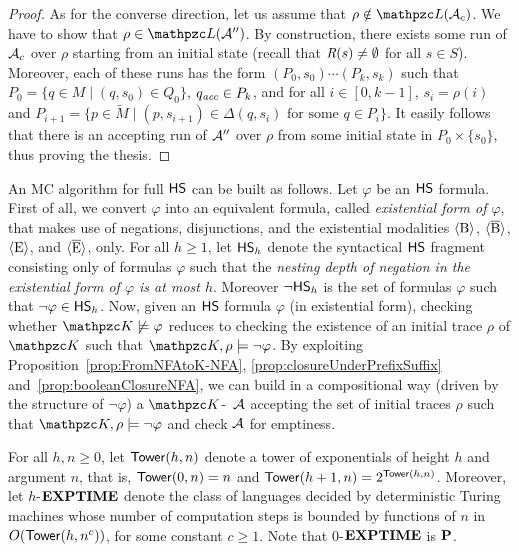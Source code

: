 \begin{proof}
As for the converse direction, let us assume that $\rho \notin \Lang(\Au_c)$.  We have to show that $\rho\in \Lang(\Au'')$.  By construction, there exists some run of
$\mathcal{A}_c$ over $\rho$ starting from an initial state (recall that $\textit{R}(s)\neq \emptyset$  for all $s\in S$). Moreover, each of these runs has the form $(P_0,s_0)\cdots (P_{k},s_k)$
such that  $P_0 = \{q\in M\mid (q,s_0)\in Q_0\}$, $q_{\textit{acc}} \in P_k$, and    for all $i\in [0,k-1]$, $s_i = \rho(i)$
and $P_{i+1} = \{p\in \tilde{M} \mid (p,s_{i+1})\in \Delta(q,s_i) \text{ for some } q\in P_i  \}$. It easily follows that there is an accepting run of
$\mathcal{A}''$ over $\rho$ from some initial state in $P_0\times \{s_0\}$, thus proving the thesis. 
\end{proof}

An MC algorithm for full $\text{\sffamily HS}$ can be built as follows.
%
Let $\varphi$ be an $\text{\sffamily HS}$ formula. First of all, we convert $\varphi$ into an equivalent formula, called \emph{existential form of $\varphi$}, that makes use of negations, disjunctions, and the existential modalities
$\operatorname{\langle B\rangle}$, $\operatorname{\langle \overline{B}\rangle}$, $\operatorname{\langle E\rangle}$, and $\operatorname{\langle \overline{E}\rangle}$, only. %
%
For all $h\geq 1$, let $\text{\sffamily HS}_h$ denote the syntactical $\text{\sffamily HS}$ fragment consisting only of formulas $\varphi$ such that the \emph{nesting depth of negation in the existential form
of $\varphi$ is at most $h$}. Moreover $\neg\text{\sffamily HS}_h$ is the set of formulas $\varphi$ such that $\neg\varphi\in \text{\sffamily HS}_h$.
%
  Now, given an $\text{\sffamily HS}$ formula $\varphi$ (in existential form), checking whether  $\Ku\not\models \varphi$ reduces to checking the existence of
an initial trace $\rho$ of $\Ku$ such that $\Ku,\rho\models \neg\varphi$. By exploiting Proposition~\ref{prop:FromNFAtoK-NFA}, \ref{prop:closureUnderPrefixSuffix} and~\ref{prop:booleanClosureNFA}, we can build  in a compositional way (driven by the structure of $\neg\varphi$) a $\Ku$-\NFA\ $\mathcal{A}$ accepting the set of initial traces $\rho$ such that $\Ku,\rho\models \neg\varphi$ and check $\mathcal{A}$ for emptiness.


For all $h,n\geq 0$, let $\mathsf{Tower}(h,n)$ denote a tower of exponentials of height $h$ and argument $n$, that is, $\mathsf{Tower}(0,n)=n$ and $\mathsf{Tower}(h+1,n)=2^{\mathsf{Tower}(h,n)}$. Moreover, let \mbox{$h$-$\textbf{EXPTIME}$} denote the class of languages decided by deterministic Turing machines whose number of computation steps is bounded by functions of $n$ in $O(\mathsf{Tower}(h,n^c))$, for some constant $c\geq 1$. Note that \mbox{$0$-$\textbf{EXPTIME}$} is $\textbf{P}$.

